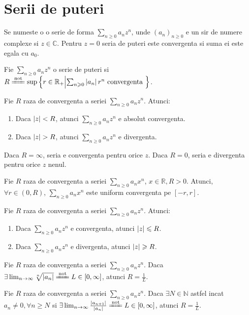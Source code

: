 \documentclass{article}
\begin{document}
\section{Serii de puteri}
\begin{enumerate}
   Se numeste o  o serie de forma $\sum_{n \geq 0} a_n z^n$, unde $(a_n)_{n \geq 0}$ e un sir de numere complexe si $z \in \mathbb{C}$.
  \observatie Pentru $z = 0$ seria de puteri este convergenta si suma ei este egala cu $a_0$.
  
   Fie $\sum_{n \geq 0} a_n z^n$ o serie de puteri si $R \xlongequal{\text{not}} \sup \left\{r \in \mathbb{R}_+ \middle\vert \sum_{n \geq 0} \abs{a_n} r^n \text{ convergenta } \right\}$.

\begin{tcolorbox}
  \propozitie Fie $R$ raza de convergenta a seriei $\sum_{n \geq 0} a_n z^n$. Atunci: 
  \begin{enumerate}
    \item Daca $\left\lvert z \right\rvert < R$, atunci $\sum_{n \geq 0} a_n z^n$ e absolut convergenta.
    \item Daca $\left\lvert z \right\rvert > R$, atunci $\sum_{n \geq 0} a_n z^n$ e divergenta.
  \end{enumerate}
  \observatie Daca $R = \infty$, seria e convergenta pentru orice $z$.
  \observatie Daca $R = 0$, seria e divergenta pentru orice $z$ nenul.
\end{tcolorbox}

\proprietate Fie $R$ raza de convergenta a seriei $\sum_{n \geq 0} a_n x^n$, $x \in \mathbb{R}, R > 0$. Atunci, $\forall r \in (0, R)$, $\sum_{n \geq 0} a_n x^n$ este uniform convergenta pe $[-r , r]$.

  \propozitie Fie $R$ raza de convergenta a seriei $\sum_{n \geq 0} a_n z^n$. Atunci: 
  \begin{enumerate}
    \item Daca $\sum_{n \geq 0} a_n z^n$ e convergenta, atunci $\left\lvert z \right\rvert \leqslant R$.
    \item Daca $\sum_{n \geq 0} a_n z^n$ e divergenta, atunci $\left\lvert z \right\rvert \geqslant R$.
  \end{enumerate}

\begin{tcolorbox}
  \propozitie Fie $R$ raza de convergenta a seriei $\sum_{n \geq 0} a_n z^n$. Daca $\exists \lim_{n \to \infty} \sqrt[n]{\abs{a_n}} \xlongequal{\text{not}} L \in [0, \infty]$, atunci $R = \frac{1}{L}$.

\corolar Fie $R$ raza de convergenta a seriei $\sum_{n \geq 0} a_n z^n$. Daca $\exists N \in \mathbb{N}$ astfel incat \\ $a_n \neq 0, \forall n \geq N$ si $\exists \lim_{n \to \infty} \frac{\abs{a_{n+1}}}{\abs{a_n}} \xlongequal{\text{not}} L \in [0, \infty]$, atunci $R = \frac{1}{L}$.
\end{tcolorbox}



\end{enumerate}
\end{document}
